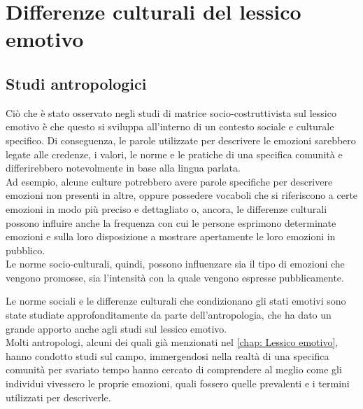 \chapter{Differenze culturali del lessico emotivo} 
\label{chap: Capitolo 3}
\section{Studi antropologici}
Ciò che è stato osservato negli studi di matrice socio-costruttivista sul lessico emotivo è che questo si sviluppa all'interno di un contesto sociale e culturale specifico. Di conseguenza, le parole utilizzate per descrivere le emozioni sarebbero legate alle credenze, i valori, le norme e le pratiche di  una specifica comunità e differirebbero notevolmente in base alla lingua parlata.\\
Ad esempio, alcune culture potrebbero avere parole specifiche per descrivere emozioni non presenti in altre, oppure possedere vocaboli che si riferiscono a certe emozioni in modo più preciso e dettagliato o, ancora, le differenze culturali possono influire anche la frequenza con cui le persone esprimono determinate emozioni e sulla loro disposizione a mostrare apertamente le loro emozioni in pubblico.\\
Le norme socio-culturali, quindi, possono influenzare sia il tipo di emozioni che vengono promosse, sia l'intensità con la quale vengono espresse pubblicamente.

Le norme sociali e le differenze culturali che condizionano gli stati emotivi sono state studiate approfonditamente da parte dell'antropologia, che ha dato un grande apporto anche agli studi sul lessico emotivo.\\
Molti antropologi, alcuni dei quali già menzionati nel \autoref{chap: Lessico emotivo}, hanno condotto studi sul campo, immergendosi nella realtà di una specifica comunità per svariato tempo hanno cercato di comprendere al meglio come gli individui vivessero le proprie emozioni, quali fossero quelle prevalenti e i termini utilizzati per descriverle. 

